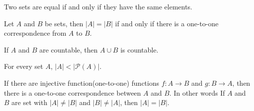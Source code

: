 \documentclass[5pt]{article}
\begin{document}
\begin{multicols}{2}
\begin{axiom}
    Two sets are equal if and only if they have the same elements.
\end{axiom}

\begin{theorem}
    Let $A$ and $B$ be sets, then $|A|=|B|$ if and only if there is a one-to-one correspondence from $A$ to $B$.
\end{theorem}

\begin{theorem}
    If $A$ and $B$ are countable, then $A\cup B$ is countable. 
\end{theorem}

\begin{theorem}
    For every set $A$, $|A|<|\mathcal{P}(A)|$.
\end{theorem}

\begin{theorem}
     If there are injective function(one-to-one) functions $f\!:A\to B$ and $g\!:B\to A$, then there is a one-to-one correspondence between $A$ and $B$. 
     In other words If $A$ and $B$ are set with $|A|\neq|B|$ and $|B|\neq|A|$, then $|A|=|B|$.
\end{theorem}


\end{multicols}
\end{document}
